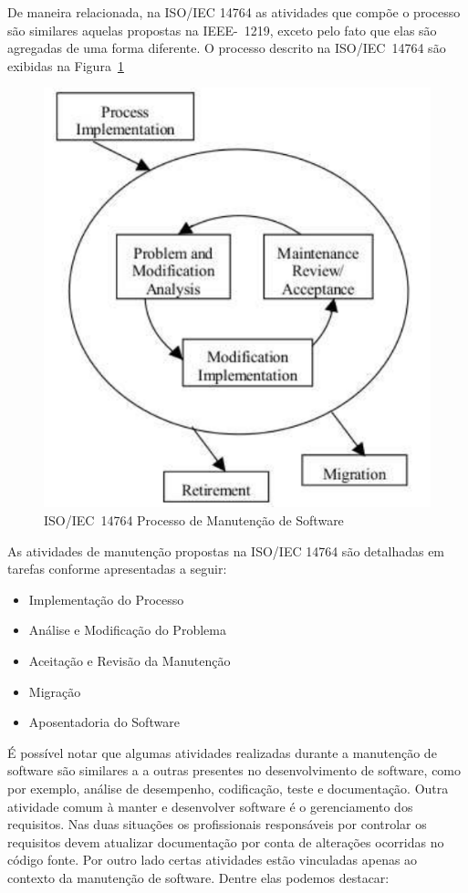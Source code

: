 De maneira relacionada, na ISO/IEC 14764 as atividades que compõe o processo são
similares aquelas propostas na IEEE-~1219, exceto pelo fato que elas são
agregadas de uma forma diferente. O processo descrito na ISO/IEC~14764 são
exibidas na Figura~\ref{fig:ieee-14764-processo-manutencao}

\begin{figure}[htpb] \centering
	\includegraphics[width=0.7\linewidth]
{chapter-manutencao-software-visao-geral/img/ieee-14764-processo-manutencao.pdf}
	\caption{ISO/IEC~14764 Processo de Manutenção de Software}
	\label{fig:ieee-14764-processo-manutencao} \end{figure}

As atividades de manutenção propostas na ISO/IEC 14764 são detalhadas em tarefas
conforme apresentadas a seguir:

\begin{itemize} \item Implementação do Processo \item Análise e Modificação do
		Problema \item Aceitação e Revisão da Manutenção \item Migração \item
		Aposentadoria do Software	\end{itemize}

É possível notar que algumas atividades realizadas durante a manutenção de
software são similares a a outras presentes no desenvolvimento de software, como
por exemplo, análise de desempenho, codificação, teste e documentação. Outra
atividade comum à manter e desenvolver software é o gerenciamento dos
requisitos. Nas duas situações os profissionais responsáveis por controlar os
requisitos devem atualizar documentação  por conta de alterações ocorridas no
código fonte. Por outro lado certas atividades estão vinculadas apenas ao
contexto da manutenção de software. Dentre elas podemos destacar:

